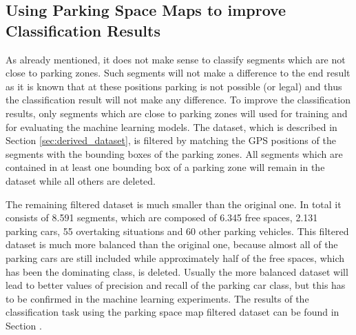 \subsection{Using Parking Space Maps to improve Classification Results}

As already mentioned, it does not make sense to classify segments which are not close to parking zones. Such segments will not make a difference to the end result as it is known that at these positions parking is not possible (or legal) and thus the classification result will not make any difference. 
To improve the classification results, only segments which are close to parking zones will used for training and for evaluating the machine learning models. The dataset, which is described in Section \ref{sec:derived_dataset}, is filtered by matching the GPS positions of the segments with the bounding boxes of the parking zones. All segments which are contained in at least one bounding box of a parking zone will remain in the dataset while all others are deleted.

The remaining filtered dataset is much smaller than the original one. In total it consists of 8.591 segments, which are composed of 6.345 free spaces, 2.131 parking cars, 55 overtaking situations and 60 other parking vehicles. This filtered dataset is much more balanced than the original one, because almost all of the parking cars are still included while approximately half of the free spaces, which has been the dominating class, is deleted. Usually the more balanced dataset will lead to better values of precision and recall of the parking car class, but this has to be confirmed in the machine learning experiments. The results of the classification task using the parking space map filtered dataset can be found in Section .





